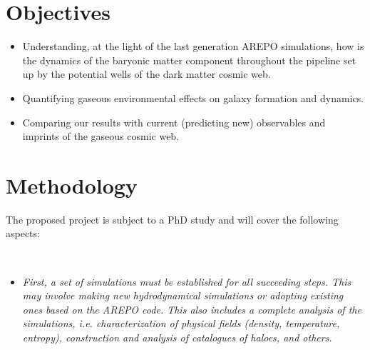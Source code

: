 \documentclass[a4,useAMS,usenatbib,usegraphicx,12pt]{article}
\begin{document}

\newpage
\section{Objectives}


\begin{itemize}

\item[\checkmark] Understanding, at the light of the last generation AREPO 
simulations, how is the dynamics of the baryonic matter component throughout
the pipeline set up by the potential wells of the dark matter cosmic web.

\item[\checkmark] Quantifying gaseous environmental effects on galaxy formation
and dynamics.

\item[\checkmark] Comparing our results with current (predicting new) observables 
and imprints of the gaseous cosmic web.


\end{itemize}



\section{Methodology}


The proposed project is subject to a PhD study and will cover the following 
aspects:

\

\begin{itemize}

\item[\checkmark] \textit{First, a set of simulations must be established for 
all succeeding steps. This may involve making new hydrodynamical simulations or 
adopting existing ones based on the AREPO code. This also includes a complete 
analysis of the simulations, i.e. characterization of physical fields (density, 
temperature, entropy), construction and analysis of catalogues of haloes, and
others.}

\end{itemize}
\end{document}
